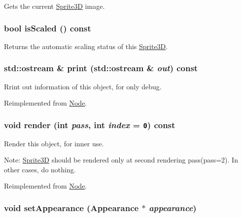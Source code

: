 Gets the current \hyperlink{classm3g_1_1Sprite3D}{Sprite3D} image. \hypertarget{classm3g_1_1Sprite3D_8e3e7fa70e1d3f2342580991105779f5}{
\subsubsection[{isScaled}]{\setlength{\rightskip}{0pt plus 5cm}bool isScaled () const}}
\label{classm3g_1_1Sprite3D_8e3e7fa70e1d3f2342580991105779f5}


Returns the automatic scaling status of this \hyperlink{classm3g_1_1Sprite3D}{Sprite3D}. \hypertarget{classm3g_1_1Sprite3D_6fea17fa1532df3794f8cb39cb4f911f}{
\subsubsection[{print}]{\setlength{\rightskip}{0pt plus 5cm}std::ostream \& print (std::ostream \& {\em out}) const}}
\label{classm3g_1_1Sprite3D_6fea17fa1532df3794f8cb39cb4f911f}


Rrint out information of this object, for only debug. 

Reimplemented from \hyperlink{classm3g_1_1Node_6fea17fa1532df3794f8cb39cb4f911f}{Node}.\hypertarget{classm3g_1_1Sprite3D_1efcb1973989d9963d5bd6d03065d389}{
\subsubsection[{render}]{\setlength{\rightskip}{0pt plus 5cm}void render (int {\em pass}, \/  int {\em index} = {\tt 0}) const}}
\label{classm3g_1_1Sprite3D_1efcb1973989d9963d5bd6d03065d389}


Render this object, for inner use.

Note: \hyperlink{classm3g_1_1Sprite3D}{Sprite3D} should be rendered only at second rendering pass(pass=2). In other cases, do nothing. 

Reimplemented from \hyperlink{classm3g_1_1Node_1efcb1973989d9963d5bd6d03065d389}{Node}.\hypertarget{classm3g_1_1Sprite3D_b9b44bad4241635062ed66437c9bae48}{
\subsubsection[{setAppearance}]{\setlength{\rightskip}{0pt plus 5cm}void setAppearance ({\bf Appearance} $\ast$ {\em appearance})}}
\label{classm3g_1_1Sprite3D_b9b44bad4241635062ed66437c9bae48}


